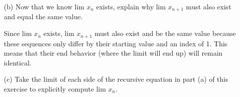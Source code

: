 \documentclass[12pt,letterpaper]{article}
\begin{document}
\begin{itemize}[leftmargin=!,labelindent=5pt]
\begin{itemize}
\begin{proof}
                    Induction Step:
                    \begin{itemize}
                        \item Suppose $k \in \bbN$ such that $k \geq 2$.
                        \item Assume for all natural numbers $i < k$, $x_i > 0$.
                        \item Need to show that $x_{k} > 0$.
                            $x_{k} = \frac{1}{4-x_{k-1}}$.
                            By the induction hypothesis, we know that $x_{k-1} > 0$.
                            Since, $3 \geq x_{k-1} > 0$, $\frac{1}{4-x_{k-1}} > 0$.
                            Thus, $x_{k} > 0$.
                    \end{itemize}
                    By the principle of complete induction, the sequence is always greater than $0$.
                    So, the sequence is bounded below by $0$.
                    Thus, the sequence is monotone and bounded. So, by the Monotone Convergence Theorem, the sequence converges.
                \end{proof}
            \item [(b)] Now that we know lim $x_n$ exists, explain why lim $x_{n+1}$ must also exist and equal the same value.
                
                Since lim $x_n$ exists, lim $x_{n+1}$ must also exist and be the same value because these sequences only differ by their starting value and an index of 1.
                This means that their end behavior (where the limit will end up) will remain identical.
            \item [(c)] Take the limit of each side of the recursive equation in part (a) of this exercise to explicitly compute lim $x_n$.
            

\end{itemize}
\end{itemize}
\end{document}
